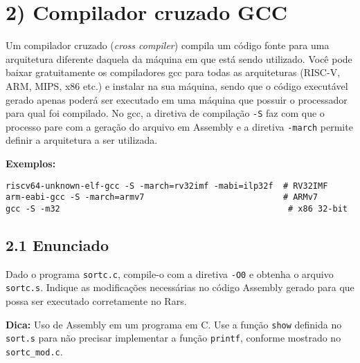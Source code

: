 \documentclass[12pt,a4paper]{article}
\begin{document}

\section*{2) Compilador cruzado GCC}

Um compilador cruzado (\textit{cross compiler}) compila um código fonte para uma arquitetura diferente daquela da máquina em que está sendo utilizado. Você pode baixar gratuitamente os compiladores gcc para todas as arquiteturas (RISC-V, ARM, MIPS, x86 etc.) e instalar na sua máquina, sendo que o código executável gerado apenas poderá ser executado em uma máquina que possuir o processador para qual foi compilado. No gcc, a diretiva de compilação \texttt{-S} faz com que o processo pare com a geração do arquivo em Assembly e a diretiva \texttt{-march} permite definir a arquitetura a ser utilizada.

\textbf{Exemplos:}
\begin{verbatim}
riscv64-unknown-elf-gcc -S -march=rv32imf -mabi=ilp32f  # RV32IMF
arm-eabi-gcc -S -march=armv7                            # ARMv7
gcc -S -m32                                              # x86 32-bit
\end{verbatim}

\subsection*{2.1 Enunciado}

Dado o programa \texttt{sortc.c}, compile-o com a diretiva \texttt{-O0} e obtenha o arquivo \texttt{sortc.s}. Indique as modificações necessárias no código Assembly gerado para que possa ser executado corretamente no Rars. 

\textbf{Dica:} Uso de Assembly em um programa em C. Use a função \texttt{show} definida no \texttt{sort.s} para não precisar implementar a função \texttt{printf}, conforme mostrado no \texttt{sortc\_mod.c}.
\end{document}
